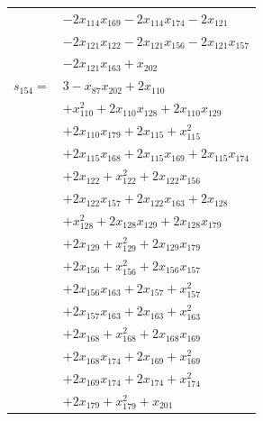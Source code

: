 \begin{longtable}{@{}r@{\;}l@{}}
 & \(\displaystyle -2x_{114}x_{169} -2x_{114}x_{174} -2x_{121}\) \\
 & \(\displaystyle -2x_{121}x_{122} -2x_{121}x_{156} -2x_{121}x_{157}\) \\
 & \(\displaystyle -2x_{121}x_{163} +x_{202}\) \\[3pt]
\(s_{154}=\) & \(\displaystyle 3 -x_{87}x_{202} +2x_{110}\) \\
 & \(\displaystyle +x_{110}^{2} +2x_{110}x_{128} +2x_{110}x_{129}\) \\
 & \(\displaystyle +2x_{110}x_{179} +2x_{115} +x_{115}^{2}\) \\
 & \(\displaystyle +2x_{115}x_{168} +2x_{115}x_{169} +2x_{115}x_{174}\) \\
 & \(\displaystyle +2x_{122} +x_{122}^{2} +2x_{122}x_{156}\) \\
 & \(\displaystyle +2x_{122}x_{157} +2x_{122}x_{163} +2x_{128}\) \\
 & \(\displaystyle +x_{128}^{2} +2x_{128}x_{129} +2x_{128}x_{179}\) \\
 & \(\displaystyle +2x_{129} +x_{129}^{2} +2x_{129}x_{179}\) \\
 & \(\displaystyle +2x_{156} +x_{156}^{2} +2x_{156}x_{157}\) \\
 & \(\displaystyle +2x_{156}x_{163} +2x_{157} +x_{157}^{2}\) \\
 & \(\displaystyle +2x_{157}x_{163} +2x_{163} +x_{163}^{2}\) \\
 & \(\displaystyle +2x_{168} +x_{168}^{2} +2x_{168}x_{169}\) \\
 & \(\displaystyle +2x_{168}x_{174} +2x_{169} +x_{169}^{2}\) \\
 & \(\displaystyle +2x_{169}x_{174} +2x_{174} +x_{174}^{2}\) \\
 & \(\displaystyle +2x_{179} +x_{179}^{2} +x_{201}\) \\[3pt]
\end{longtable}
\endgroup
